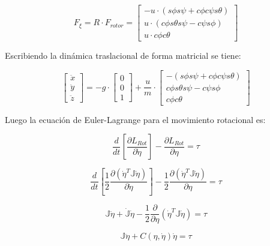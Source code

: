 \documentclass[\main/main.tex]{subfiles}
\begin{document}
\begin{equation}
F_{\xi}=R\cdot F_{rotor}=\begin{bmatrix}-u\cdot(s\phi s\psi+c\phi c\psi s\theta)\\
u\cdot(c\phi s\theta s\psi-c\psi s\phi)\\
u\cdot c\phi c\theta
\end{bmatrix}
\end{equation}

Escribiendo la dinámica traslacional de forma matricial se tiene:

\begin{equation}
\begin{bmatrix}\ddot{x}\\
\ddot{y}\\
\ddot{z}
\end{bmatrix}=-g\cdot\begin{bmatrix}0\\
0\\
1
\end{bmatrix}+\frac{u}{m}\cdot\begin{bmatrix}-(s\phi s\psi+c\phi c\psi s\theta)\\
c\phi s\theta s\psi-c\psi s\phi\\
c\phi c\theta
\end{bmatrix}
\end{equation}

Luego la ecuación de Euler-Lagrange para el movimiento rotacional
es:

\begin{equation}
\frac{d}{dt}\left[\frac{\partial L_{Rot}}{\partial\dot{\eta}}\right]-\frac{\partial L_{Rot}}{\partial\eta}=\tau
\end{equation}

\begin{equation}
\frac{d}{dt}\left[\frac{1}{2}\frac{\partial(\dot{\eta}^{T}\mathbb{J}\dot{\eta})}{\partial\dot{\eta}}\right]-\frac{1}{2}\frac{\partial(\dot{\eta}^{T}\mathbb{J}\dot{\eta})}{\partial\eta}=\tau
\end{equation}

\begin{equation}
\mathbb{J}\ddot{\eta}+\dot{\mathbb{J}}\dot{\eta}-\frac{1}{2}\frac{\partial}{\partial\eta}(\dot{\eta}^{T}\mathbb{J}\dot{\eta})=\tau
\end{equation}

\begin{equation}
\mathbb{J}\ddot{\eta}+C(\eta,\dot{\eta})\dot{\eta}=\tau\label{eq:rotacional lagrangeano}
\end{equation}
\end{document}
